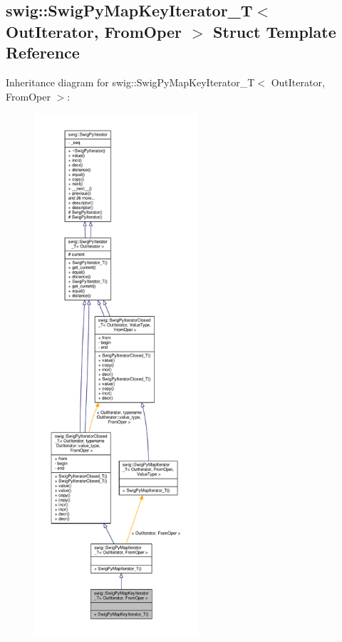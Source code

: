 \subsection{swig\+:\+:Swig\+Py\+Map\+Key\+Iterator\+\_\+T$<$ Out\+Iterator, From\+Oper $>$ Struct Template Reference}
\label{structswig_1_1SwigPyMapKeyIterator__T}


Inheritance diagram for swig\+:\+:Swig\+Py\+Map\+Key\+Iterator\+\_\+T$<$ Out\+Iterator, From\+Oper $>$\+:
\nopagebreak
\begin{figure}[H]
\begin{center}
\leavevmode
\includegraphics[height=550pt]{d5/dc1/structswig_1_1SwigPyMapKeyIterator__T__inherit__graph}
\end{center}
\end{figure}


